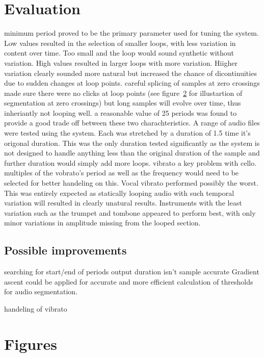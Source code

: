 \documentclass[titlepage]{scrartcl}
\begin{document}
\section{Evaluation}
minimum period proved to be the primary parameter used for tuning the system.
Low values resulted in the selection of smaller loops, with less variation in
content over time. Too small and the loop would sound synthetic without
variation. High values resulted in larger loops with more variation. Hiigher
variation clearly sounded more natural but increased the chance of
dicontinuities due to sudden changes at loop points. careful splicing of
samples at zero crossings made sure there were no clicks at loop points (see
figure~\ref{} for illustartion of segmentation at zero crossings) but
long samples will evolve over time, thus inheriantly not looping well.
a reasonable value of 25 periods was found to provide a good trade off between
these two charachteristics.
A range of audio files were tested using the system. Each was stretched by a
duration of 1.5 time it's origonal duration. This was the only duration tested
significantly as the system is not designed to handle anything less than the
original duration of the sample and further duration would simply add more
loops.
vibrato a key problem with cello. multiples of the vobrato's period as well as
the frequency would need to be selected for better handeling on this. 
Vocal vibrato performed possibly the worst. This was entirely expected as
statically looping audio with such temporal variation will resulted in clearly
unatural results.
Instruments with the least variation such as the trumpet and tombone appeared
to perform best, with only minor variations in amplitude missing from the
looped section.

\subsection{Possible improvements}
searching for start/end of periods
output duration isn't sample accurate
Gradient ascent could be applied for accurate and more efficient calculation
of thresholds for audio segmentation.

handeling of vibrato

\section{Figures}

\printbibliography
\end{document}
